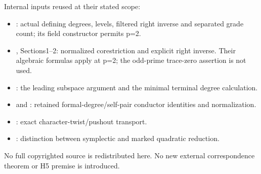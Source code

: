 Internal inputs reused at their stated scope:

\begin{itemize}
\tightlist
\item
  : actual defining degrees,
  levels, filtered right inverse and separated grade count; its field
  constructor permits p=2.
\item
  , Sections1--2:
  normalized corestriction and explicit right inverse. Their algebraic
  formulas apply at p=2; the odd-prime trace-zero assertion is not used.
\item
  : the leading
  subspace argument and the minimal terminal degree calculation.
\item
   and
  :
  retained formal-degree/self-pair conductor identities and
  normalization.
\item
  : exact character-twist/pushout
  transport.
\item
  :
  distinction between symplectic and marked quadratic reduction.
\end{itemize}

No full copyrighted source is redistributed here. No new external
correspondence theorem or H5 premise is introduced.
